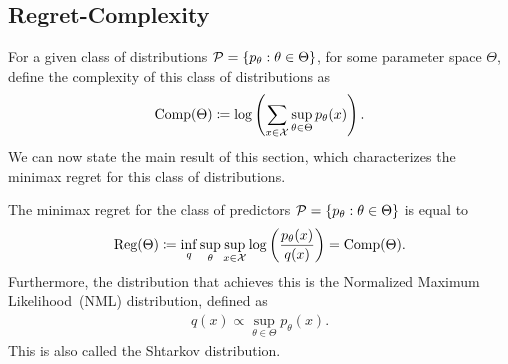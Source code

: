     \subsection{Regret-Complexity}
        \label{subsec:regret-complexity} 
        For a given class of distributions $\mathcal{P} = \{ p_\theta: \theta \in \Theta \}$, for some parameter space $\Theta$, define the complexity of this class of distributions as 
        \begin{align}
            \text{Comp}(\Theta) \coloneqq \log \left(  \sum_{x \in \mathcal{X}} \sup_{\theta \in \Theta } p_{\theta}(x) \right). 
        \end{align}
        We can now state the main result of this section, which characterizes the minimax regret for this class of distributions. 
        \begin{theorem}
            \label{thm:regret-complexity} The minimax regret for the class of predictors $\mathcal{P} = \{p_{\theta}: \theta \in \Theta\}$ is equal to 
            \begin{align}
                \text{Reg}(\Theta) \coloneqq  \inf_{q} \sup_{\theta} \sup_{x \in \mathcal{X}} \log \left( \frac{p_\theta(x)}{q(x)}\right) = \text{Comp}(\Theta). 
            \end{align}
            Furthermore, the distribution that achieves this is the Normalized Maximum Likelihood~(NML) distribution, defined as 
            \begin{align}
                q(x) \propto \sup_{\theta \in \Theta} p_\theta(x). 
            \end{align}
            This is also called the Shtarkov distribution. 
        \end{theorem}
